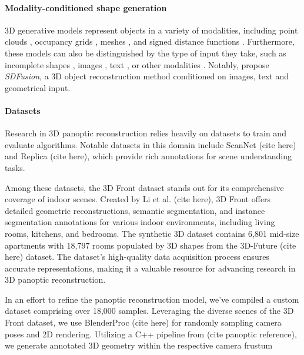 \paragraph{Modality-conditioned shape generation}
3D generative models represent objects in a variety of modalities, including point clouds \citep{achlioptas2018learning, luo2021diffusion}, occupancy grids \citep{mescheder2019occupancy}, meshes \citep{mo2019structurenet}, and signed distance functions \citep{park2019deepsdf}.
Furthermore, these models can also be distinguished by the type of input they take, such as incomplete shapes \citep{dai2017shape}, images \citep{fan2017point}, text \citep{liu2022towards, zhao2023michelangelo}, or other modalities \citep{Zhou_2021_CVPR}. 
Notably, \citet{cheng2023sdfusion} propose \emph{SDFusion}, a 3D object reconstruction method conditioned on images, text and geometrical input.

\paragraph{Datasets}
Research in 3D panoptic reconstruction relies heavily on datasets to train and evaluate algorithms. Notable datasets in this domain include ScanNet (cite here) and Replica (cite here), which provide rich annotations for scene understanding tasks.

Among these datasets, the 3D Front dataset stands out for its comprehensive coverage of indoor scenes. Created by Li et al. (cite here), 3D Front offers detailed geometric reconstructions, semantic segmentation, and instance segmentation annotations for various indoor environments, including living rooms, kitchens, and bedrooms.
The synthetic 3D dataset contains 6,801 mid-size apartments with 18,797 rooms populated by 3D shapes from the 3D-Future (cite here) dataset. The dataset's high-quality data acquisition process ensures accurate representations, making it a valuable resource for advancing research in 3D panoptic reconstruction.

In an effort to refine the panoptic reconstruction model, we've compiled a custom dataset comprising over 18,000 samples. Leveraging the diverse scenes of the 3D Front dataset, we use BlenderProc (cite here) for randomly sampling camera poses and 2D rendering. Utilizing a C++ pipeline from (cite panoptic reference), we generate annotated 3D geometry within the respective camera frustum